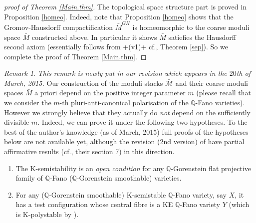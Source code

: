\documentclass[12pt]{amsart}
\theoremstyle{remark}
\newtheorem{Rem}[Thm]{Remark}
\theoremstyle{definition}
\begin{document}
\begin{proof}[proof of Theorem \ref{Main.thm}]
The topological space structure part is proved in Proposition \ref{homeo}. 
Indeed, note that Proposition \ref{homeo} shows that the Gromov-Hausdorff compactification 
$\bar{M}^{GH}$ is homeomorphic to the coarse moduli space $\bar{M}$ constructed 
above. In particular it shows $\bar{M}$ satiefies the Hausdorff second axiom 
(essentially follows from \cite{CDS}+\cite{LWX}(v1)+\cite{SSY} cf., Theorem \ref{sep}). 
So we complete the proof of Theorem \ref{Main.thm}. 
\end{proof}

\begin{Rem}\label{last.comments}
\textit{This remark is newly put in our revision which appears in the $20$th of March, 2015. }
Our construction of the moduli stacks $\bar{\mathcal{M}}$ and their 
coarse moduli spaces $\bar{M}$ 
a priori depend on the positive integer parameter $m$ (please recall that we consider the $m$-th 
pluri-anti-canonical polarisation of the $\mathbb{Q}$-Fano varieties). 
However we strongly believe 
that they actually do \textit{not} depend on the sufficiently divisible $m$. 
Indeed, we can prove it under the following two hypotheses. 
To the best of the author's knowledge (as of March, 2015) full proofs 
of the hypotheses below are not available yet, although the revision ($2$nd version) of \cite{LWX} 
have partial affirmative results (cf., their section 7) in this direction. 

\begin{enumerate}
\item The K-semistability is an \textit{open condition} for any $\mathbb{Q}$-Gorenstein flat projective family of $\mathbb{Q}$-Fano ($\mathbb{Q}$-Gorenstein smoothable) varieties. 
\item  For any ($\mathbb{Q}$-Gorenstein smoothable) K-semistable 
$\mathbb{Q}$-Fano variety, say $X$, it has a test configuration whose central fibre is a KE 
$\mathbb{Q}$-Fano variety $Y$ (which is K-polystable by \cite{Ber}). 
\end{enumerate}


\end{Rem}
\end{document}

